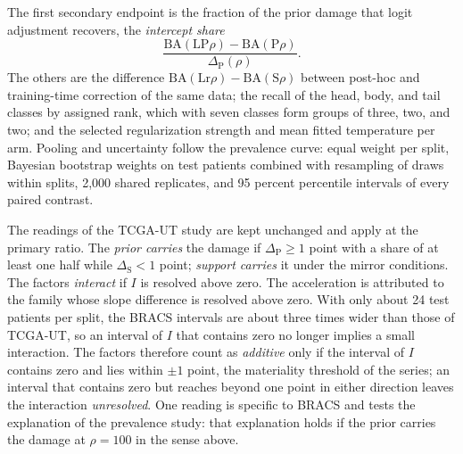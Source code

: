 \documentclass[11pt]{article}
\begin{document}
The first secondary endpoint is the fraction of the prior damage that logit adjustment recovers, the \emph{intercept share}
\begin{equation}
  \frac{\mathrm{BA}(\text{LP}\rho)-\mathrm{BA}(\text{P}\rho)}{\Delta_\text{P}(\rho)}.
  \label{eq:intercept-share}
\end{equation}
\noindent The others are the difference $\mathrm{BA}(\text{Lr}\rho)-\mathrm{BA}(\text{S}\rho)$ between post-hoc and training-time correction of the same data; the recall of the head, body, and tail classes by assigned rank, which with seven classes form groups of three, two, and two; and the selected regularization strength and mean fitted temperature per arm. Pooling and uncertainty follow the prevalence curve: equal weight per split, Bayesian bootstrap weights on test patients \citep{rubin1981bayesian} combined with resampling of draws within splits, 2,000 shared replicates, and 95 percent percentile intervals of every paired contrast.

The readings of the TCGA-UT study are kept unchanged and apply at the primary ratio. The \emph{prior carries} the damage if $\Delta_\text{P}\geq1$ point with a share of at least one half while $\Delta_\text{S}<1$ point; \emph{support carries} it under the mirror conditions. The factors \emph{interact} if $I$ is resolved above zero. The acceleration is attributed to the family whose slope difference is resolved above zero. With only about 24 test patients per split, the BRACS intervals are about three times wider than those of TCGA-UT, so an interval of $I$ that contains zero no longer implies a small interaction. The factors therefore count as \emph{additive} only if the interval of $I$ contains zero and lies within $\pm1$ point, the materiality threshold of the series; an interval that contains zero but reaches beyond one point in either direction leaves the interaction \emph{unresolved}. One reading is specific to BRACS and tests the explanation of the prevalence study: that explanation holds if the prior carries the damage at $\rho=100$ in the sense above.





\end{document}
